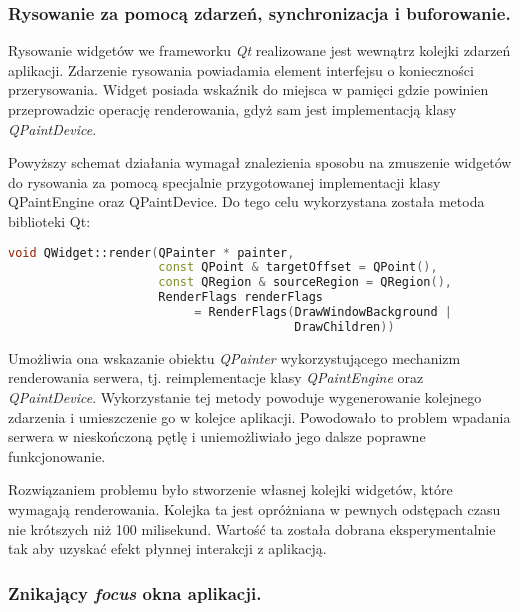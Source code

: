 \subsubsection{Rysowanie za pomocą zdarzeń, synchronizacja i buforowanie.}
\label{rendering_events}

Rysowanie widgetów we frameworku \emph{Qt} realizowane jest wewnątrz kolejki zdarzeń aplikacji. Zdarzenie rysowania powiadamia element interfejsu o konieczności przerysowania. Widget posiada wskaźnik do miejsca w pamięci gdzie powinien przeprowadzic operację renderowania, gdyż sam jest implementacją klasy \emph{QPaintDevice}. 

Powyższy schemat działania wymagał znalezienia sposobu na zmuszenie widgetów do rysowania za pomocą specjalnie przygotowanej implementacji klasy QPaintEngine oraz QPaintDevice. Do tego celu wykorzystana została metoda biblioteki Qt:

\begin{lstlisting}[language=C++,numbers=none]
void QWidget::render(QPainter * painter, 
                     const QPoint & targetOffset = QPoint(), 
                     const QRegion & sourceRegion = QRegion(), 
                     RenderFlags renderFlags 
                          = RenderFlags(DrawWindowBackground | 
                                        DrawChildren))
\end{lstlisting}

Umożliwia ona wskazanie obiektu \emph{QPainter} wykorzystującego mechanizm renderowania serwera, tj. reimplementacje klasy \emph{QPaintEngine} oraz \emph{QPaintDevice}. Wykorzystanie tej metody powoduje wygenerowanie kolejnego zdarzenia i umieszczenie go w kolejce aplikacji. Powodowało to problem wpadania serwera w nieskończoną pętlę i uniemożliwiało jego dalsze poprawne funkcjonowanie. 

Rozwiązaniem problemu było stworzenie własnej kolejki widgetów, które wymagają renderowania. Kolejka ta jest opróżniana w pewnych odstępach czasu nie krótszych niż 100 milisekund. Wartość ta została dobrana eksperymentalnie tak aby uzyskać efekt płynnej interakcji z aplikacją.

\subsubsection{Znikający \emph{focus} okna aplikacji.}
\label{problems_focus}


